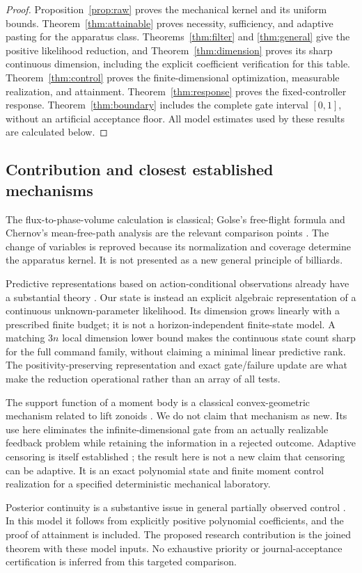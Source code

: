 \begin{proof}
Proposition~\ref{prop:raw} proves the mechanical kernel and its uniform
bounds. Theorem~\ref{thm:attainable} proves necessity, sufficiency, and
adaptive pasting for the apparatus class. Theorems~\ref{thm:filter} and
\ref{thm:general} give the positive likelihood reduction, and
Theorem~\ref{thm:dimension} proves its sharp continuous dimension, including the
explicit coefficient verification for this table. Theorem~\ref{thm:control}
proves the finite-dimensional optimization, measurable realization, and
attainment. Theorem~\ref{thm:response} proves the fixed-controller response.
Theorem~\ref{thm:boundary} includes the complete gate interval $[0,1]$,
without an artificial acceptance floor. All model estimates used by these
results are calculated below.
\end{proof}

\subsection{Contribution and closest established mechanisms}
The flux-to-phase-volume calculation is classical; Golse's free-flight
formula and Chernov's mean-free-path analysis are the relevant comparison
points \cite{Golse,Chernov}. The change of variables is reproved because its
normalization and coverage determine the apparatus kernel. It is not
presented as a new general principle of billiards.

Predictive representations based on action-conditional observations already
have a substantial theory \cite{LittmanSutton}. Our state is instead an
explicit algebraic representation of a continuous unknown-parameter
likelihood. Its dimension grows linearly with a prescribed finite budget;
it is not a horizon-independent finite-state model. A matching $3n$ local
dimension lower bound makes the continuous state count sharp for the
full command family, without claiming a minimal linear predictive rank.
The positivity-preserving representation and exact gate/failure update are
what make the reduction operational rather than an array of all tests.

The support function of a moment body is a classical convex-geometric
mechanism related to lift zonoids \cite{KulikTymoshkevych}. We do not claim
that mechanism as new. Its use here eliminates the infinite-dimensional
gate from an actually realizable feedback problem while retaining the
information in a rejected outcome. Adaptive censoring is itself established
\cite{RenEtAl}; the result here is not a new claim that censoring can be
adaptive. It is an exact polynomial state and finite moment control
realization for a specified deterministic mechanical laboratory.

Posterior continuity is a substantive issue in general partially observed
control \cite{FeinbergEtAl}. In this model it follows from explicitly
positive polynomial coefficients, and the proof of attainment is included.
The proposed research contribution is the joined theorem with these model
inputs. No exhaustive priority or journal-acceptance certification is
inferred from this targeted comparison.
